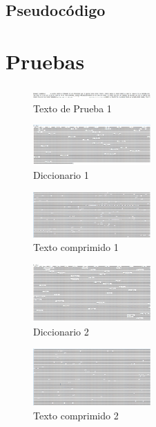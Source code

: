\documentclass{IEEEtran}
\begin{document}
\subsection{Pseudoc\'odigo}



\section{Pruebas}

\begin{figure}[!ht]
  \caption{Texto de Prueba 1}
  \centering
    \includegraphics[width=0.4\textwidth]{Prueba_1.png}
\end{figure}

\begin{figure}[!ht]
  \caption{Diccionario 1}
  \centering
    \includegraphics[width=0.4\textwidth]{Prueba_2.png}
\end{figure}

\begin{figure}[!ht]
  \caption{Texto comprimido 1}
  \centering
    \includegraphics[width=0.4\textwidth]{Prueba_3.png}
\end{figure}

\begin{figure}[!ht]
  \caption{Diccionario 2}
  \centering
    \includegraphics[width=0.4\textwidth]{Prueba_4.png}
\end{figure}

\begin{figure}[!ht]
  \caption{Texto comprimido 2}
  \centering
    \includegraphics[width=0.4\textwidth]{Prueba_5.png}
\end{figure}
\end{document}
